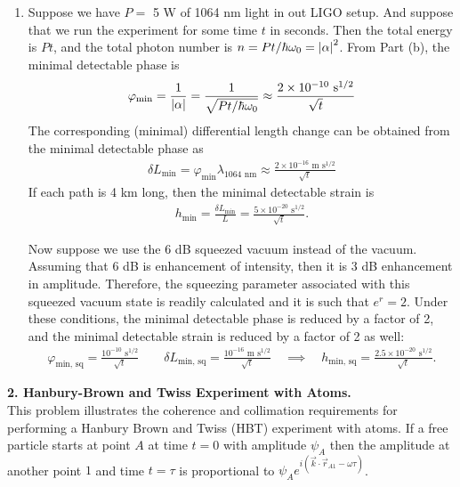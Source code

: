 \documentclass{article}
\theoremstyle{definition}
\newcommand{\al}{\alpha}
\newcommand{\f}[2]{\frac{#1}{#2}}
\begin{document}
\begin{enumerate}[label=(\alph*)]
\item Suppose we have $P=$ 5 W of 1064 nm light in out LIGO setup. And suppose that we run the experiment for some time $t$ in seconds. Then the total energy is $Pt$, and the total photon number is $n = Pt/\hbar \omega_0 = \abs{\al}^2$. From Part (b), the minimal detectable phase is 
\begin{align*}
\varphi_\text{min} = \f{1}{\abs{\al}} = \f{1}{{\sqrt{P t/\hbar \omega_0 }}} \approx \f{2 \times 10^{-10} \text{ s}^{1/2}}{\sqrt{t}} 
\end{align*}
The corresponding (minimal) differential length change can be obtained from the minimal detectable phase as 
\begin{align*}
\delta L_\text{min} = \varphi_\text{min} \lambda_{1064 \text{ nm}}  \approx \f{2\times 10^{-16} \text{ m s}^{1/2}}{\sqrt{t}}
\end{align*}
If each path is 4 km long, then the minimal detectable strain is 
\begin{align*}
h_\text{min} = \f{\delta L_\text{min}}{L} = \f{5\times 10^{-20} \text{ s}^{1/2}}{\sqrt{t}}.
\end{align*}


Now suppose we use the 6 dB squeezed vacuum instead of the vacuum. Assuming that 6 dB is enhancement of intensity, then it is 3 dB enhancement in amplitude. Therefore, the squeezing parameter associated with this squeezed vacuum state is readily calculated and it is such that $e^r = 2$. Under these conditions, the minimal detectable phase is reduced by a factor of 2, and the minimal detectable strain is reduced by a factor of 2 as well:
\begin{align*}
\varphi_\text{min, sq} = \f{10^{-10} \text{ s}^{1/2}}{\sqrt{t}}
\quad\quad 
\delta 
L_\text{min, sq} = \f{10^{-16} \text{ m s}^{1/2}}{\sqrt{t}}
\quad 
\implies 
\quad 
h_\text{min, sq} =  \f{2.5\times 10^{-20} \text{ s}^{1/2}}{\sqrt{t}}.
\end{align*}


\end{enumerate}



\noindent \textbf{2. Hanbury-Brown and Twiss Experiment with Atoms.}  \\

\noindent This problem illustrates the coherence and collimation requirements for performing a Hanbury
Brown and Twiss (HBT) experiment with atoms.  If a free particle starts at point $A$ at time $t=0$ with amplitude $\psi_A$ then the amplitude at another point $1$ and time $t = \tau$ is proportional to $\psi_A e^{i( \vec{k}\cdot \vec{r}_{A1}  -\omega \tau)} $. 
\end{document}
